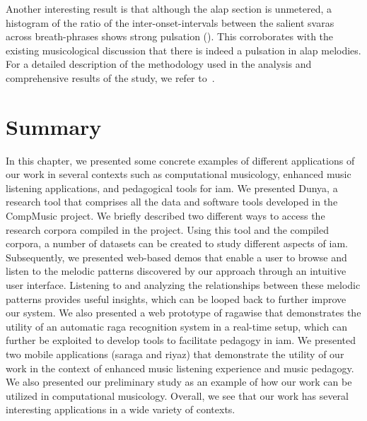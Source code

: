 Another interesting result is that although the \gls{alap} section is unmetered, a histogram of the ratio of the inter-onset-intervals between the salient \glspl{svara} across breath-phrases shows strong pulsation (). This corroborates with the existing musicological discussion that there is indeed a pulsation in \gls{alap} melodies. For a detailed description of the methodology used in the analysis and comprehensive results of the study, we refer to~\cite{kaustuv_ismir_2016}.

\section{Summary}
\label{sec:applications_summary}

In this chapter, we presented some concrete examples of different applications of our work in several contexts such as computational musicology, enhanced music listening applications, and pedagogical tools for \gls{iam}. We presented Dunya, a research tool that comprises all the data and software tools developed in the CompMusic project. We briefly described two different ways to access the research corpora compiled in the project. Using this tool and the compiled corpora, a number of datasets can be created to study different aspects of \gls{iam}. Subsequently, we presented web-based demos that enable a user to browse and listen to the melodic patterns discovered by our approach through an intuitive user interface. Listening to and analyzing the relationships between these melodic patterns provides useful insights, which can be looped back to further improve our system. We also presented a web prototype of \gls{ragawise} that demonstrates the utility of an automatic \gls{raga} recognition system in a real-time setup, which can further be exploited to develop tools to facilitate pedagogy in \gls{iam}. We presented two mobile applications (\gls{saraga} and \gls{riyaz}) that demonstrate the utility of our work in the context of enhanced music listening experience and music pedagogy. We also presented our preliminary study as an example of how our work can be utilized in computational musicology. Overall, we see that our work has several interesting applications in a wide variety of contexts.

